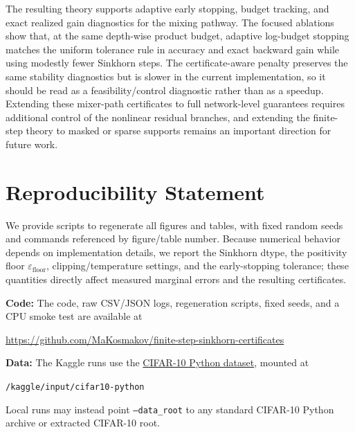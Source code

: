 \documentclass[11pt]{article}
\numberwithin{equation}{section}
\theoremstyle{plain}
\theoremstyle{definition}
\theoremstyle{remark}
\newcommand{\epsfloor}{\varepsilon_{\mathrm{floor}}}
\begin{document}
The resulting theory supports adaptive early stopping, budget tracking, and
exact realized gain diagnostics for the mixing pathway.  The focused ablations
show that, at the same depth-wise product budget, adaptive log-budget stopping
matches the uniform tolerance rule in accuracy and exact backward gain while
using modestly fewer Sinkhorn steps.  The certificate-aware penalty preserves
the same stability diagnostics but is slower in the current implementation, so
it should be read as a feasibility/control diagnostic rather than as a speedup.
Extending these mixer-path certificates to full network-level guarantees
requires additional control of the nonlinear residual branches, and extending
the finite-step theory to masked or sparse supports remains an important
direction for future work.


 \section*{Reproducibility Statement}
We provide scripts to regenerate all figures and tables, with fixed random seeds and commands referenced by figure/table number. Because numerical behavior depends on implementation details, we report the Sinkhorn dtype, the positivity floor $\epsfloor$, clipping/temperature settings, and the early-stopping tolerance; these quantities directly affect measured marginal errors and the resulting certificates.

 


\medskip
\noindent\textbf{Code:} The code, raw CSV/JSON logs, regeneration scripts,
fixed seeds, and a CPU smoke test are available at
\begin{center}
\small\url{https://github.com/MaKosmakov/finite-step-sinkhorn-certificates}
\end{center}

\noindent\textbf{Data:} The Kaggle runs use the
\href{https://www.kaggle.com/datasets/pankrzysiu/cifar10-python}{CIFAR-10 Python dataset},
mounted at
\begin{center}
\small\texttt{/kaggle/input/cifar10-python}
\end{center}
\noindent Local runs may instead point \texttt{--data\_root} to any standard
CIFAR-10 Python archive or extracted CIFAR-10 root.
 
\end{document}
